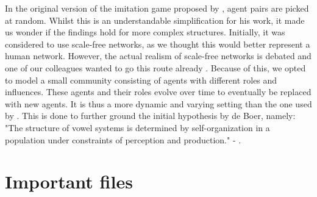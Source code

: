 In the original version of the imitation game proposed by \citet{deBoer2000}, agent pairs are picked at random.
Whilst this is an understandable simplification for his work, it made us wonder if the findings hold for more complex structures.
Initially, it was considered to use scale-free networks, as we thought this would better represent a human network.
However, the actual realism of scale-free networks is debated and one of our colleagues wanted to go this route already \citep{scalefreebad}.
Because of this, we opted to model a small community consisting of agents with different roles and influences.
These agents and their roles evolve over time to eventually be replaced with new agents.
It is thus a more dynamic and varying setting than the one used by \citet{deBoer2000}.
This is done to further ground the initial hypothesis by de Boer, namely: "The structure of vowel systems is determined by self-organization in a population under constraints of perception and production." - \citet{deBoer2000}.

\section{Important files}
\label{sec:general_remarks_files}

